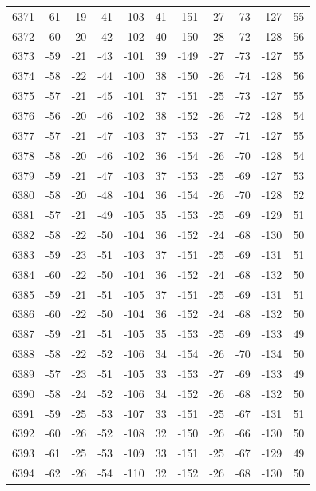 \begin{table}[H]
\begin{tabular}{lllllllllll}
6371 & -61 & -19 & -41 & -103 & 41 & -151 & -27 & -73 & -127 & 55 \\
6372 & -60 & -20 & -42 & -102 & 40 & -150 & -28 & -72 & -128 & 56 \\
6373 & -59 & -21 & -43 & -101 & 39 & -149 & -27 & -73 & -127 & 55 \\
6374 & -58 & -22 & -44 & -100 & 38 & -150 & -26 & -74 & -128 & 56 \\
6375 & -57 & -21 & -45 & -101 & 37 & -151 & -25 & -73 & -127 & 55 \\
6376 & -56 & -20 & -46 & -102 & 38 & -152 & -26 & -72 & -128 & 54 \\
6377 & -57 & -21 & -47 & -103 & 37 & -153 & -27 & -71 & -127 & 55 \\
6378 & -58 & -20 & -46 & -102 & 36 & -154 & -26 & -70 & -128 & 54 \\
6379 & -59 & -21 & -47 & -103 & 37 & -153 & -25 & -69 & -127 & 53 \\
6380 & -58 & -20 & -48 & -104 & 36 & -154 & -26 & -70 & -128 & 52 \\
6381 & -57 & -21 & -49 & -105 & 35 & -153 & -25 & -69 & -129 & 51 \\
6382 & -58 & -22 & -50 & -104 & 36 & -152 & -24 & -68 & -130 & 50 \\
6383 & -59 & -23 & -51 & -103 & 37 & -151 & -25 & -69 & -131 & 51 \\
6384 & -60 & -22 & -50 & -104 & 36 & -152 & -24 & -68 & -132 & 50 \\
6385 & -59 & -21 & -51 & -105 & 37 & -151 & -25 & -69 & -131 & 51 \\
6386 & -60 & -22 & -50 & -104 & 36 & -152 & -24 & -68 & -132 & 50 \\
6387 & -59 & -21 & -51 & -105 & 35 & -153 & -25 & -69 & -133 & 49 \\
6388 & -58 & -22 & -52 & -106 & 34 & -154 & -26 & -70 & -134 & 50 \\
6389 & -57 & -23 & -51 & -105 & 33 & -153 & -27 & -69 & -133 & 49 \\
6390 & -58 & -24 & -52 & -106 & 34 & -152 & -26 & -68 & -132 & 50 \\
6391 & -59 & -25 & -53 & -107 & 33 & -151 & -25 & -67 & -131 & 51 \\
6392 & -60 & -26 & -52 & -108 & 32 & -150 & -26 & -66 & -130 & 50 \\
6393 & -61 & -25 & -53 & -109 & 33 & -151 & -25 & -67 & -129 & 49 \\
6394 & -62 & -26 & -54 & -110 & 32 & -152 & -26 & -68 & -130 & 50 \\

\end{tabular}
\end{table}
